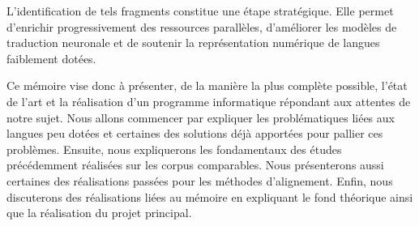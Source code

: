 L’identification de tels fragments constitue une étape stratégique. Elle permet d’enrichir progressivement
des ressources parallèles, d’améliorer les modèles de traduction neuronale et de soutenir la représentation numérique de
langues faiblement dotées.

Ce mémoire vise donc à présenter, de la manière la plus complète possible, l'état de l'art et
la réalisation d'un programme informatique répondant aux attentes de notre sujet.
Nous allons commencer par expliquer les problématiques liées aux langues peu dotées et certaines
des solutions déjà apportées pour pallier ces problèmes. Ensuite, nous expliquerons les fondamentaux des études précédemment
réalisées sur les corpus comparables. Nous présenterons aussi certaines des réalisations passées pour
les méthodes d'alignement. Enfin, nous discuterons des réalisations liées au mémoire en expliquant le fond
théorique ainsi que la réalisation du projet principal.